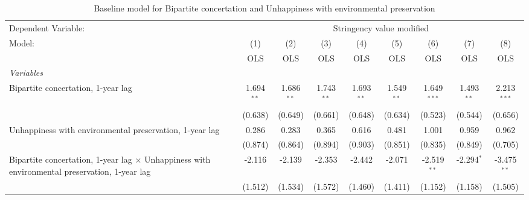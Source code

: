 
\begin{table}[htbp]
   \caption{Baseline model for Bipartite concertation and Unhappiness with environmental preservation}
   \centering
   \begin{tabular}{lcccccccc}
      \toprule
      Dependent Variable: & \multicolumn{8}{c}{Stringency value modified}\\
      Model:                                                                                               & (1)          & (2)          & (3)          & (4)          & (5)          & (6)           & (7)           & (8)\\  
                                                                                                           &  OLS         & OLS          & OLS          & OLS          & OLS          & OLS           & OLS           & OLS\\  
      \midrule
      \emph{Variables}\\
      Bipartite concertation, 1-year lag                                                                   & 1.694$^{**}$ & 1.686$^{**}$ & 1.743$^{**}$ & 1.693$^{**}$ & 1.549$^{**}$ & 1.649$^{***}$ & 1.493$^{**}$  & 2.213$^{***}$\\   
                                                                                                           & (0.638)      & (0.649)      & (0.661)      & (0.648)      & (0.634)      & (0.523)       & (0.544)       & (0.656)\\   
      Unhappiness with environmental preservation, 1-year lag                                              & 0.286        & 0.283        & 0.365        & 0.616        & 0.481        & 1.001         & 0.959         & 0.962\\   
                                                                                                           & (0.874)      & (0.864)      & (0.894)      & (0.903)      & (0.851)      & (0.835)       & (0.849)       & (0.705)\\   
      Bipartite concertation, 1-year lag $\times$ Unhappiness with environmental preservation, 1-year lag  & -2.116       & -2.139       & -2.353       & -2.442       & -2.071       & -2.519$^{**}$ & -2.294$^{*}$  & -3.475$^{**}$\\   
                                                                                                           & (1.512)      & (1.534)      & (1.572)      & (1.460)      & (1.411)      & (1.152)       & (1.158)       & (1.505)\\   

\end{tabular}
\end{table}
